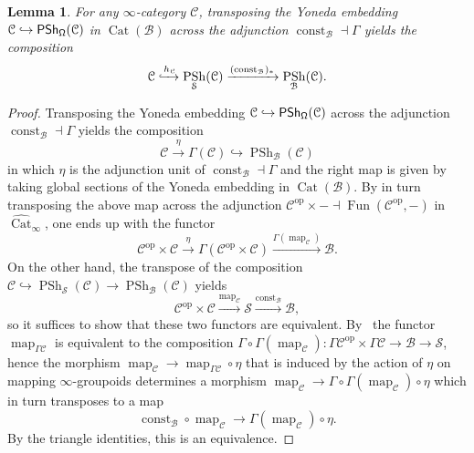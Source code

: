 \documentclass[reqno]{amsart}
\numberwithin{equation}{subsection}
\theoremstyle{plain}
\newtheorem{lemma}[equation]{Lemma}
\theoremstyle{definition}
\let\scr=\mathcal
\let\into=\hookrightarrow
\def\BB{\scr B}
\def\CC{\scr C}
\def\SS{\scr S}
\DeclareMathOperator{\PSh}{PSh}
\DeclareMathOperator{\IPSh}{\mathsf{PSh}}
\DeclareMathOperator{\Cat}{Cat}
\DeclareMathOperator{\Fun}{Fun}
\DeclareMathOperator{\Map}{map}
\DeclareMathOperator{\const}{const}
\newcommand{\op}{\mathrm{op}}
\newcommand{\map}[1]{\Map_{#1}}
\newcommand{\CatSS}{\widehat{\Cat}_\infty}
\begin{document}
\begin{lemma}
	\label{lem:YonedaEmbeddingGlobalSections}
	For any $\infty$-category $\CC$, transposing the Yoneda embedding $\CC\into \IPSh_{\Univ}(\CC)$ in $\Cat(\BB)$ across the adjunction $\const_\BB\dashv \Gamma$ yields the composition
	\begin{equation*}
	\CC\xhookrightarrow{h_{\CC}} \PSh_{\SS}(\CC)\xrightarrow{(\const_\BB)_\ast} \PSh_{\BB}(\CC).
	\end{equation*}
\end{lemma}
\begin{proof}
	Transposing the Yoneda embedding $\CC\into\IPSh_{\Univ}(\CC)$ across the adjunction $\const_{\BB}\dashv \Gamma$ yields the composition
	\begin{equation*}
	\CC\xrightarrow{\eta} \Gamma(\CC)\into \PSh_{\BB}(\CC)
	\end{equation*}
	in which $\eta$ is the adjunction unit of $\const_{\BB}\dashv\Gamma$ and the right map is given by taking global sections of the Yoneda embedding in $\Cat(\BB)$. By in turn transposing the above map across the adjunction $\CC^{\op}\times -\dashv \Fun(\CC^{\op},-)$ in $\CatSS$, one ends up with the functor
	\begin{equation*}
	\CC^{\op}\times\CC\xrightarrow{\eta} \Gamma(\CC^{\op}\times\CC)\xrightarrow{\Gamma (\map{\CC})}\BB.
	\end{equation*}
	On the other hand, the transpose of the composition $\CC\into\PSh_{\SS}(\CC)\to\PSh_{\BB}(\CC)$ yields
	\begin{equation*}
	\CC^{\op}\times\CC\xrightarrow{\map{\CC}} \SS\xrightarrow{\const_\BB}\BB,
	\end{equation*}
	so it suffices to show that these two functors are equivalent. By~\cite[Lemma~4.4.10]{Martini2021a} the functor $\map{\Gamma\CC}$ is equivalent to the composition $\Gamma\circ\Gamma(\map{\CC})\colon \Gamma\CC^{\op}\times\Gamma\CC\to \BB\to \SS$, hence the morphism $\map{\CC}\to \map{\Gamma\CC}\circ\eta$ that is induced by the action of $\eta$ on mapping $\infty$-groupoids determines a morphism
	$\map{\CC}\to \Gamma\circ\Gamma(\map{\CC})\circ\eta$
	which in turn transposes to a map
	\begin{equation*}
	\const_\BB\circ\map{\CC}\to\Gamma(\map{\CC})\circ\eta.
	\end{equation*}
	By the triangle identities, this is an equivalence.
\end{proof}
\end{document}
